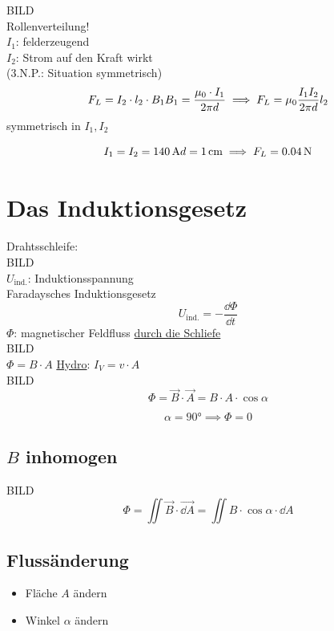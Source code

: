 \begin{bsp*}[ note = Kraft zwischen zwei Leitern ]
	BILD \\
	Rollenverteilung! \\
	$I_1$: felderzeugend \\
	$I_2$: Strom auf den Kraft wirkt \\
	(3.N.P.: Situation symmetrisch)
	\[
		F_L = I_2 \cdot l_2 \cdot B_1 \\
		B_1 = \frac{\mu_0 \cdot I_1}{2 \pi d} \\
		\implies F_L = \mu_0 \frac{I_1 I_2}{2 \pi d} l_2
	\]
	symmetrisch in $I_1 , I_2$
	\begin{bsp*}[ note = im Experiment ]
		\[
			I_1 = I_2 = \SI{140}{\ampere} \\
			d = \SI{1}{\centi\metre}
			\implies F_L = \SI{0.04}{\newton}
		\]
	\end{bsp*}
\end{bsp*}

\section{Das Induktionsgesetz}
Drahtsschleife: \\
BILD \\
$U_{\text{ind.}}$: Induktionsspannung \\
Faradaysches Induktionsgesetz
\[ \boxed{ U_{\text{ind.}} = - \frac{\dd \Phi}{\dd t} } \]
$\Phi$: magnetischer Feldfluss \uline{durch die Schliefe} \\
BILD \\
$\Phi = B \cdot A$
\uline{Hydro}: $I_V = v \cdot A$ \\
BILD \\
\[ \Phi = \vec{B} \cdot \vec{A} = B \cdot A \cdot \cos \alpha \]
\begin{bsp*}[ head = z.B. ]
	\[ \alpha = \ang{90} \implies \Phi = 0 \]
\end{bsp*}

\subsection{\texorpdfstring{$B$}{B} inhomogen}
BILD \\
\[ \Phi = \iint \vec{B} \cdot \vec{\dd A} = \iint B \cdot \cos \alpha \cdot \dd A \]

\subsection{Flussänderung}
\begin{itemize}
	\item Fläche $A$ ändern
	\item Winkel $\alpha$ ändern
\end{itemize} 

